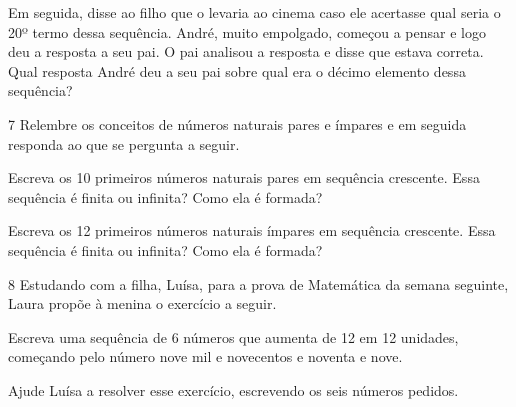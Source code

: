 Em seguida, disse ao filho que o levaria ao cinema caso ele acertasse
qual seria o 20º termo dessa sequência. André, muito empolgado, começou a
pensar e logo deu a resposta a seu pai. O pai analisou a resposta e
disse que estava correta. Qual resposta André deu a seu pai sobre qual era o décimo elemento
dessa sequência?

\begin{mdframed}[linewidth=2pt,linecolor=salmao,roundcorner=2pt]

\end{mdframed}

\num{7} Relembre os conceitos de números naturais pares e ímpares e em seguida
responda ao que se pergunta a seguir.

\begin{escolha}
\item
  Escreva os 10 primeiros números naturais pares em sequência crescente.
  Essa sequência é finita ou infinita? Como ela é formada?


\item
  Escreva os 12 primeiros números naturais ímpares em sequência
  crescente. Essa sequência é finita ou infinita? Como ela é formada?

\end{escolha}


\num{8} Estudando com a filha, Luísa, para a prova de Matemática da semana seguinte,
Laura propõe à menina o exercício a seguir.

Escreva uma sequência de 6 números que aumenta de 12 em 12 unidades,
começando pelo número nove mil e novecentos e noventa e nove.

Ajude Luísa a resolver esse exercício, escrevendo os seis números
pedidos.


